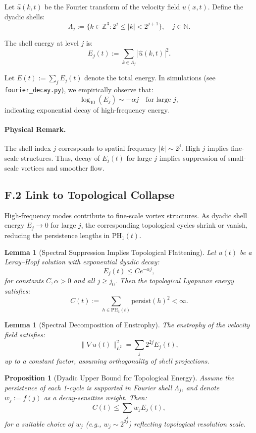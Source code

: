 \documentclass[11pt]{article}
\newtheorem{lemma}[theorem]{Lemma}
\newtheorem{proposition}[theorem]{Proposition}
\theoremstyle{definition}
\begin{document}
Let \( \hat{u}(k, t) \) be the Fourier transform of the velocity field \( u(x, t) \). Define the dyadic shells:
\[ 
\Lambda_j := \{k \in \mathbb{Z}^3 : 2^j \leq |k| < 2^{j+1}\}, \quad j \in \mathbb{N}. 
\]

The shell energy at level \( j \) is:
\[ 
E_j(t) := \sum_{k \in \Lambda_j} |\hat{u}(k, t)|^2.
\]

Let \( E(t) := \sum_j E_j(t) \) denote the total energy. In simulations (see \texttt{fourier\_decay.py}), we
empirically observe that:
\[ 
\log_{10}(E_j) \sim -\alpha j \quad \text{for large } j, 
\]
indicating exponential decay of high-frequency energy.

\paragraph{Physical Remark.} The shell index \( j \) corresponds to spatial frequency \( |k| \sim 2^j \). High \( j \)
implies fine-scale structures. Thus, decay of \( E_j(t) \) for large \( j \) implies suppression of small-scale vortices
and smoother flow.

\subsection*{F.2 Link to Topological Collapse}

High-frequency modes contribute to fine-scale vortex structures. As dyadic shell energy \( E_j \to 0 \) for
large \( j \), the corresponding topological cycles shrink or vanish, reducing the persistence lengths in
\( \mathrm{PH}_1(t) \).

\begin{lemma}[Spectral Suppression Implies Topological Flattening]
Let \( u(t) \) be a Leray--Hopf solution with exponential dyadic decay:
\[ 
E_j(t) \leq C e^{-\alpha j},
\]
for constants \( C, \alpha > 0 \) and all \( j \geq j_0 \). Then the topological Lyapunov energy satisfies:
\[ 
C(t) := \sum_{h \in \mathrm{PH}_1(t)} \text{persist}(h)^2 < \infty.
\]
\end{lemma}

\begin{lemma}[Spectral Decomposition of Enstrophy]
The enstrophy of the velocity field satisfies:
\[ 
\|\nabla u(t)\|_{L^2}^2 = \sum_j 2^{2j} E_j(t),
\]
up to a constant factor, assuming orthogonality of shell projections.
\end{lemma}

\begin{proposition}[Dyadic Upper Bound for Topological Energy]
Assume the persistence of each 1-cycle is supported in Fourier shell \( \Lambda_j \), and denote
\( w_j := f(j) \) as a decay-sensitive weight. Then:
\[ 
C(t) \leq \sum_j w_j E_j(t),
\]
for a suitable choice of \( w_j \) (e.g., \( w_j \sim 2^{2j} \)) reflecting topological resolution scale.
\end{proposition}
\end{document}
